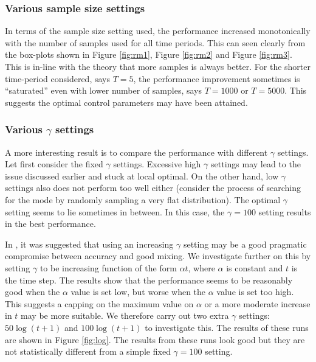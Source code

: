 \subsubsection{Various sample size settings}
In terms of the sample size setting used, the performance increased monotonically with the number of samples used for all time periods. This can seen clearly from the box-plots shown in Figure \ref{fig:rm1}, Figure \ref{fig:rm2} and Figure \ref{fig:rm3}. This is in-line with the theory that more samples is always better. For the shorter time-period considered, says $T=5$, the performance improvement sometimes is ``saturated'' even with lower number of samples, says $T=1000$ or $T=5000$. This suggests the optimal control parameters may have been attained.

 \subsubsection{Various $\gamma$ settings}
A more interesting result is to compare the performance with different $\gamma$ settings. Let first consider the fixed $\gamma$ settings. Excessive high $\gamma$ settings may lead to the issue discussed earlier and stuck at local optimal. On the other hand, low $\gamma$ settings also does not perform too well either (consider the process of searching for the mode by randomly sampling a very flat distribution). The optimal $\gamma$ setting seems to lie sometimes in between. In this case, the $\gamma=100$ setting results in the best performance.

In \cite{NK11}, it was suggested that using an increasing $\gamma$ setting may be a good pragmatic compromise between accuracy and good mixing. We investigate further on this by setting $\gamma$ to be increasing function of the form $\alpha t$, where $\alpha$ is constant and $t$ is the time step. The results show that the performance seems to be reasonably good when the $\alpha$ value is set low, but  worse when the $\alpha$ value is set too high. This suggests a capping on the maximum value on $\alpha$ or a more moderate increase in $t$ may be more suitable. We therefore carry out two extra $\gamma$ settings: $50\log(t+1)$ and $100\log(t+1)$ to investigate this. The results of these runs are shown in Figure \ref{fig:log}. The results from these runs look good but they are not statistically different from a simple fixed $\gamma=100$ setting.

